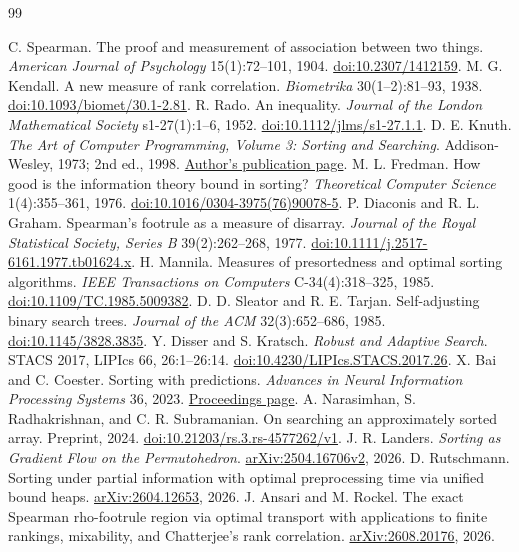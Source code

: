\documentclass[10pt,letterpaper]{article}
\begin{document}
\vspace{-2pt}
\begin{thebibliography}{99}
\setlength{\itemsep}{0pt}
\setlength{\parskip}{0pt}
\small
\raggedright
{} C. Spearman. The proof and measurement of association between two
things. \emph{American Journal of Psychology} 15(1):72--101, 1904.
\href{https://doi.org/10.2307/1412159}{doi:10.2307/1412159}.
 M. G. Kendall. A new measure of rank correlation.
\emph{Biometrika} 30(1--2):81--93, 1938.
\href{https://doi.org/10.1093/biomet/30.1-2.81}{doi:10.1093/biomet/30.1-2.81}.
 R. Rado. An inequality. \emph{Journal of the London Mathematical
Society} s1-27(1):1--6, 1952.
\href{https://doi.org/10.1112/jlms/s1-27.1.1}{doi:10.1112/jlms/s1-27.1.1}.
 D. E. Knuth. \emph{The Art of Computer Programming, Volume 3:
Sorting and Searching}. Addison-Wesley, 1973; 2nd ed., 1998.
\href{https://cs.stanford.edu/~knuth/taocp.html}{Author's publication page}.
 M. L. Fredman. How good is the information theory bound in
sorting? \emph{Theoretical Computer Science} 1(4):355--361, 1976.
\href{https://doi.org/10.1016/0304-3975(76)90078-5}{doi:10.1016/0304-3975(76)90078-5}.
 P. Diaconis and R. L. Graham. Spearman's footrule as a
measure of disarray. \emph{Journal of the Royal Statistical Society, Series B}
39(2):262--268, 1977.
\href{https://doi.org/10.1111/j.2517-6161.1977.tb01624.x}{doi:10.1111/j.2517-6161.1977.tb01624.x}.
 H. Mannila. Measures of presortedness and optimal sorting
algorithms. \emph{IEEE Transactions on Computers} C-34(4):318--325, 1985.
\href{https://doi.org/10.1109/TC.1985.5009382}{doi:10.1109/TC.1985.5009382}.
 D. D. Sleator and R. E. Tarjan. Self-adjusting binary search
trees. \emph{Journal of the ACM} 32(3):652--686, 1985.
\href{https://doi.org/10.1145/3828.3835}{doi:10.1145/3828.3835}.
 Y. Disser and S. Kratsch. \emph{Robust and Adaptive Search}.
STACS 2017, LIPIcs 66, 26:1--26:14.
\href{https://doi.org/10.4230/LIPIcs.STACS.2017.26}{doi:10.4230/LIPIcs.STACS.2017.26}.
 X. Bai and C. Coester. Sorting with predictions.
\emph{Advances in Neural Information Processing Systems} 36, 2023.
\href{https://papers.neurips.cc/paper_files/paper/2023/hash/544696ef4847c903376ed6ec58f3a703-Abstract-Conference.html}{Proceedings page}.
 A. Narasimhan, S. Radhakrishnan, and C. R. Subramanian.
On searching an approximately sorted array. Preprint, 2024.
\href{https://doi.org/10.21203/rs.3.rs-4577262/v1}{doi:10.21203/rs.3.rs-4577262/v1}.
 J. R. Landers. \emph{Sorting as Gradient Flow on the Permutohedron}.
\href{https://arxiv.org/abs/2504.16706v2}{arXiv:2504.16706v2}, 2026.
 D. Rutschmann. Sorting under partial information with
optimal preprocessing time via unified bound heaps.
\href{https://arxiv.org/abs/2604.12653}{arXiv:2604.12653}, 2026.
 J. Ansari and M. Rockel. The exact Spearman rho-footrule
region via optimal transport with applications to finite rankings, mixability,
and Chatterjee's rank correlation.
\href{https://arxiv.org/abs/2608.20176}{arXiv:2608.20176}, 2026.
\end{thebibliography}
\end{document}
